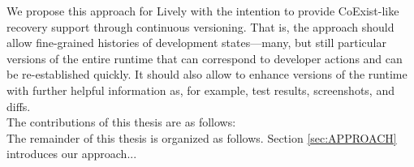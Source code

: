 We propose this approach for Lively with the intention to provide CoExist-like recovery support through continuous versioning.
That is, the approach should allow fine-grained histories of development states---many, but still particular versions of the entire runtime that can correspond to developer actions and can be re-established quickly.
It should also allow to enhance versions of the runtime with further helpful information as, for example, test results, screenshots, and diffs. \\

The contributions of this thesis are as follows: \\

The remainder of this thesis is organized as follows. Section \ref{sec:APPROACH} introduces our approach... \\
